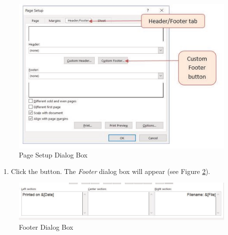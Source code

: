 \begin{figure}[H]
	\centering
	\includegraphics[width=\maxwidth{.95\linewidth}]{gfx/ch02_fig44}
	\caption{Page Setup Dialog Box}
	\label{02:fig44}
\end{figure}

\begin{enumerate}[resume]
	\item Click the  button. The \textit{Footer} dialog box will appear (see Figure \ref{02:fig45}).
\end{enumerate}

\begin{figure}[H]
	\centering
	\includegraphics[width=\maxwidth{.95\linewidth}]{gfx/ch02_fig45}
	\caption{Footer Dialog Box}
	\label{02:fig45}
\end{figure}


